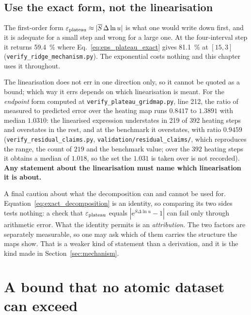 \subsection{Use the exact form, not the linearisation}

The first-order form $\varepsilon_{\mathrm{plateau}} \approx |\overline{S}\,\Delta\ln u|$ is what one
would write down first, and it is adequate for a small step and wrong for a
large one. At the four-interval step it returns \SI{59.4}{\percent} where
Eq.~\eqref{eq:eps_plateau_exact} gives \SI{81.1}{\percent} at $[15,3]$
(\texttt{verify\_ridge\_mechanism.py}). The exponential costs nothing and this
chapter uses it throughout.

The linearisation does not err in one direction only, so it cannot be quoted as
a bound; which way it
errs depends on which linearisation is meant. For the \emph{endpoint} form
computed at \texttt{verify\_plateau\_gridmap.py}, line 212, the ratio of measured to
predicted error over the heating map runs $0.8417$ to $1.3891$ with median
$1.0310$: the linearised expression understates in 219 of 392 heating steps and
overstates in the rest, and at the benchmark it overstates, with ratio $0.9459$
(\texttt{verify\_residual\_claims.py}, \texttt{validation/residual\_claims/}, which reproduces the range, the count of $219$ and the benchmark value; over the $392$ heating steps it obtains a median of $1.018$, so the set the $1.031$ is taken over is not recorded). \textbf{Any statement about the linearisation
must name which linearisation it is about.}

A final caution about what the decomposition can and cannot be used for.
Equation~\eqref{eq:exact_decomposition} is an identity, so comparing its two
sides tests nothing: a check that $\varepsilon_{\mathrm{plateau}}$ equals
$|\mathrm{e}^{\overline{S}\Delta\ln u}-1|$ can fail only through arithmetic
error. What the identity permits is an \emph{attribution}. The two factors are
separately measurable, so one may ask which of them carries the structure the
maps show. That is a weaker kind of statement than a derivation, and it is the
kind made in Section~\ref{sec:mechanism}.

\section{A bound that no atomic dataset can exceed}
\label{sec:bound}

